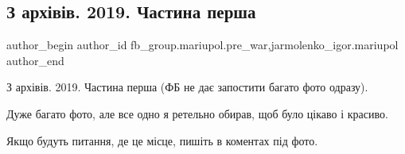  
 
 
 
 

\subsection{З архівів. 2019. Частина перша}
\label{sec:07_02_2023.fb.fb_group.mariupol.pre_war.2.z_arkh_v_v__2019__ch}
 
\ifcmt
 author_begin
   author_id fb_group.mariupol.pre_war,jarmolenko_igor.mariupol
 author_end
\fi

З архівів. 2019. Частина перша (ФБ не дає запостити багато фото одразу).

Дуже багато фото, але все одно я ретельно обирав, щоб було цікаво і красиво.

Якщо будуть питання, де це місце, пишіть в коментах під фото.

